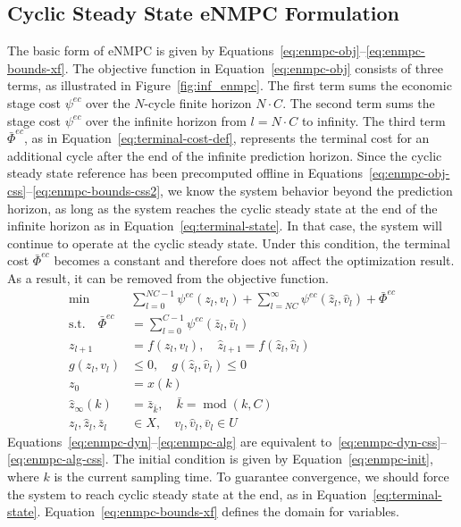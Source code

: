 \documentclass[11pt]{article}
\begin{document}
\subsection{Cyclic Steady State eNMPC Formulation}

The basic form of eNMPC is given by Equations~\eqref{eq:enmpc-obj}--\eqref{eq:enmpc-bounds-xf}. The objective function in Equation~\eqref{eq:enmpc-obj} consists of three terms, as illustrated in Figure~\ref{fig:inf_enmpc}. The first term sums the economic stage cost $\psi^{ec}$ over the $N$-cycle finite horizon $N \cdot C$. The second term sums the stage cost $\psi^{ec}$ over the infinite horizon from $l = N \cdot C$ to infinity. The third term $\bar{\Phi}^{ec}$, as in Equation~\eqref{eq:terminal-cost-def}, represents the terminal cost for an additional cycle after the end of the infinite prediction horizon. Since the cyclic steady state reference has been precomputed offline in Equations~\eqref{eq:enmpc-obj-css}--\eqref{eq:enmpc-bounds-css2}, we know the system behavior beyond the prediction horizon, as long as the system reaches the cyclic steady state at the end of the infinite horizon as in Equation~\eqref{eq:terminal-state}. In that case, the system will continue to operate at the cyclic steady state. Under this condition, the terminal cost $\bar{\Phi}^{ec}$ becomes a constant and therefore does not affect the optimization result. As a result, it can be removed from the objective function.
\begin{align}
\min \quad &\sum_{l=0}^{NC-1} \psi^{ec}(z_l, v_l) + \sum_{l=NC}^{\infty} \psi^{ec}(\hat{z}_l, \hat{v}_l) + \bar{\Phi}^{ec} \label{eq:enmpc-obj}\\
\text{s.t.} \quad \bar{\Phi}^{ec} &= \sum_{l=0}^{C-1} \psi^{ec}(\bar{z}_l, \bar{v}_l) \label{eq:terminal-cost-def}\\
z_{l+1} &= f(z_l, v_l), \quad \hat{z}_{l+1} = f(\hat{z}_l, \hat{v}_l) \label{eq:enmpc-dyn}\\
g(z_l, v_l) &\leq 0, \quad g(\hat{z}_l, \hat{v}_l) \leq 0 \label{eq:enmpc-alg}\\
z_0 &= x(k) \label{eq:enmpc-init}\\
\hat{z}_{\infty}(k) &= \bar{z}_{\bar{k}}, \quad \bar{k} = \operatorname{mod}(k, C) \label{eq:terminal-state}\\
z_l, \hat{z}_l, \bar{z}_l &\in X, \quad v_l, \hat{v}_l, \bar{v}_l \in U\label{eq:enmpc-bounds-xf}
\end{align}
Equations~\eqref{eq:enmpc-dyn}--\eqref{eq:enmpc-alg} are equivalent to~\eqref{eq:enmpc-dyn-css}--\eqref{eq:enmpc-alg-css}. The initial condition is given by Equation~\eqref{eq:enmpc-init}, where $k$ is the current sampling time. To guarantee convergence, we should force the system to reach cyclic steady state at the end, as in Equation~\eqref{eq:terminal-state}. Equation~\eqref{eq:enmpc-bounds-xf} defines the domain for variables.
\end{document}
